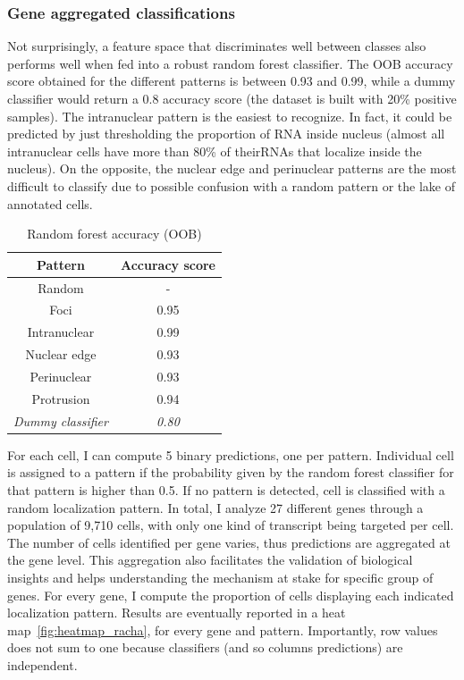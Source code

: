 \subsubsection{Gene aggregated classifications}

Not surprisingly, a feature space that discriminates well between classes also performs well when fed into a robust random forest classifier.
The \ac{OOB} accuracy score obtained for the different patterns is between 0.93 and 0.99, while a dummy classifier would return a 0.8 accuracy score (the dataset is built with 20\% positive samples).
The intranuclear pattern is the easiest to recognize.
In fact, it could be predicted by just thresholding the proportion of \ac{RNA} inside nucleus (almost all intranuclear cells have more than 80\% of their\ac{RNA}s that localize inside the nucleus).
On the opposite, the nuclear edge and perinuclear patterns are the most difficult to classify due to possible confusion with a random pattern or the lake of annotated cells.

\begin{table}
	\centering
	\begin{tabular}{| c | c |}
		\hline
		Pattern & Accuracy score\\
		\hline
		Random & -\\
		Foci & 0.95\\
		Intranuclear & 0.99\\
		Nuclear edge & 0.93\\
		Perinuclear & 0.93\\
		Protrusion & 0.94\\
		\hline
		\textit{Dummy classifier} & \textit{0.80}\\
		\hline
	\end{tabular}
	\caption{Random forest accuracy (OOB)}
	\label{table:accuracy_oob}
\end{table}

For each cell, I can compute 5 binary predictions, one per pattern.
Individual cell is assigned to a pattern if the probability given by the random forest classifier for that pattern is higher than 0.5.
If no pattern is detected, cell is classified with a random localization pattern.
In total, I analyze 27 different genes through a population of 9,710 cells, with only one kind of transcript being targeted per cell.
The number of cells identified per gene varies, thus predictions are aggregated at the gene level.
This aggregation also facilitates the validation of biological insights and helps understanding the mechanism at stake for specific group of genes.
For every gene, I compute the proportion of cells displaying each indicated localization pattern.
Results are eventually reported in a heat map~\ref{fig:heatmap_racha}, for every gene and pattern.
Importantly, row values does not sum to one because classifiers (and so columns predictions) are independent.

